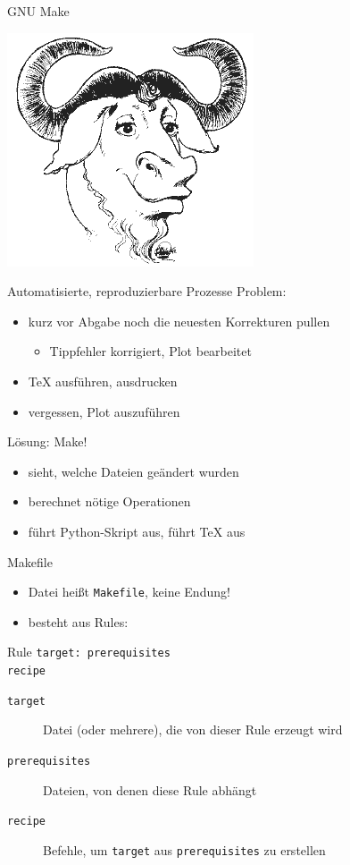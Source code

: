 \begin{frame}{GNU Make}
  \begin{center}
    \includegraphics[scale=0.5]{logos/gnu.png}
  \end{center}
\end{frame}

\begin{frame}{Automatisierte, reproduzierbare Prozesse}
  Problem:
  \begin{itemize}
    \item kurz vor Abgabe noch die neuesten Korrekturen pullen
      \begin{itemize}
        \item Tippfehler korrigiert, Plot bearbeitet
      \end{itemize}
    \item \TeX{} ausführen, ausdrucken
    \item vergessen, Plot auszuführen
  \end{itemize}
  Lösung: Make!
  \begin{itemize}
    \item sieht, welche Dateien geändert wurden
    \item berechnet nötige Operationen
    \item führt Python-Skript aus, führt \TeX{} aus
  \end{itemize}
\end{frame}

\begin{frame}{Makefile}
  \begin{itemize}
    \item Datei heißt \texttt{Makefile}, keine Endung!
    \item besteht aus Rules:
  \end{itemize}
  \begin{block}{Rule}
    \texttt{target: prerequisites\\
    \hspace{1cm} recipe}
  \end{block}
  \begin{description}
    \item[\texttt{target}] Datei (oder mehrere), die von dieser Rule erzeugt wird
    \item[\texttt{prerequisites}] Dateien, von denen diese Rule abhängt
    \item[\texttt{recipe}] Befehle, um \texttt{target} aus \texttt{prerequisites} zu erstellen
  \end{description}
\end{frame}

